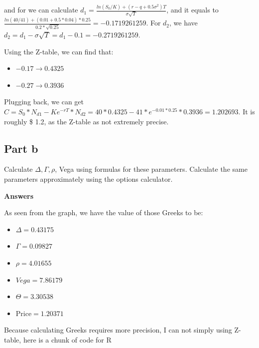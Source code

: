 \documentclass[letterpaper]{article}
\begin{document}
		and for we can calculate $d_1=\frac{ln(S_0/K)+(r-q+0.5\sigma^2)T}{\sigma\sqrt{T}}$, and it equals to $\frac{ln(40/41)+(0.01+0.5*0.04)*0.25}{0.2*\sqrt{0.25}}=-0.1719261259$. For $d_2$, we have $d_2=d_1-\sigma \sqrt{T}=d_1-0.1=-0.2719261259$. 
		
		Using the Z-table, we can find that:
		
		\begin{itemize}
			\item $-0.17\rightarrow 0.4325$
			\item $-0.27\rightarrow 0.3936$
		\end{itemize}
		
		Plugging back, we can get $C=S_0*N_{d1}-Ke^{-rT}*N_{d2}=40*0.4325-41*e^{-0.01*0.25}*0.3936=1.202693$. It is roughly \$ 1.2, as the Z-table as not extremely precise. 
		
		\subsection{Part b}
		Calculate $\Delta, \Gamma, \rho$, Vega using formulas for these parameters. Calculate the same parameters approximately using the options calculator.
		
		\textbf{Answers}
		
		As seen from the graph, we have the value of those Greeks to be:
		
		\begin{itemize}
			\item $\Delta=0.43175$
			\item $\Gamma=0.09827$
			\item $\rho=4.01655$
			\item $Vega=7.86179$
			\item $\Theta=3.30538$
			\item $\text{Price}=1.20371$
		\end{itemize}
	
	Because calculating Greeks requires more precision, I can not simply using Z-table, here is a chunk of code for R
	
\end{document}
